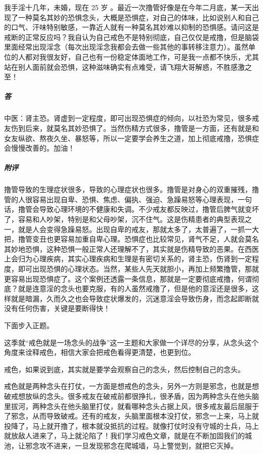 \begin{case}
    我手淫十几年，未婚，现在 25 岁 。最近一次撸管好像是在今年二月底，某一天出现了一种莫名其妙的恐惧念头，大概是恐惧症，对自己的体味，比如说别人和自己的口气、汗味特别敏感，一靠近人就有一种莫名其妙难以抑制的恐惧感。请问这是戒断的正常反应吗？我自认为自己戒色不是特别彻底，自己仅仅是戒撸，但是脑袋里面经常出现淫念（每次出现淫念我都会去做一些其他的事转移注意力）。虽然单位的人都对我很友好，自己也有一份稳定体面地工作，可是我一点都不快乐，尤其站在别人面前就会恐惧，这种滋味确实有点难受，请飞翔大哥解惑，不胜感激之至！
    \subparagraph{答} 中医：肾主恐。肾虚到一定程度，即可出现恐惧症的倾向，以社恐为常见，很多戒友伤到后来，就莫名其妙恐惧了。当然伤精方式很多，撸管是一方面，还有就是和女友纵欲、熬夜久坐、暴怒等，所以一定要学会养生之道，加上彻底戒撸，恐惧症会慢慢改善的。加油！
    \subparagraph{附评} 撸管导致的生理症状很多，导致的心理症状也很多。撸管是对身心的双重摧残，撸管的人很容易出现自卑、恐惧、焦虑、偏执、强迫、急躁易怒等心理表现，一句话，撸管会导致心理环境的不健康和失调。不少戒友都反映过，撸管后脾气就变坏了，容易和人吵架，特别是和父母吵架，沉不住气。这是伤精患者的典型表现之一，就是人会变得急躁易怒。出现自卑的戒友，那就太多了，太普遍了，一抓一大把，撸管变丑也更容易加重自卑心理。恐惧症也比较常见，肾气不足，人就会莫名其妙地恐惧，这种恐惧一般正常人还理解不了，其实就是伤精导致的恶果。在西医上会归为心理疾病，其实心理疾病和生理是有密切关系的，肾主恐，伤肾到一定程度，即可出现恐惧的心理状态。当然，某些人先天就胆小，再加上频繁撸管，那就更容易出现恐惧症了。这个案例还透露一条信息，那就是一定要彻底戒撸，何谓彻底？就是连意淫的念头也要克服，有的人虽然戒撸了，但是他的意淫还是很多，这样就是暗漏，久而久之也会导致症状爆发的，沉迷意淫会导致伤身，而念起即断就没有任何伤害，关键是要断得快！
\end{case}

下面步入正题。

这季就“戒色就是一场念头的战争”这一主题和大家做一个详尽的分享，从念头这个角度来诠释戒色，相信大家会把戒色看得更清楚，也更到位。

戒色，如果说到底，其实就是要学会观察自己的念头，然后控制自己的念头。

戒色就是两种念头在打仗，一方面是想戒色的念头，另外一方则是邪念，也就是想破戒想放纵的念头。很多戒友在破戒前都很挣扎，很矛盾，因为两种念头在他头脑里拔河，两种念头在他头脑里打仗，就看哪种念头占据上风，很多戒友最后屈服于了邪念，从而导致破戒。还有的戒友，头脑里面根本没打仗，邪念一上来，马上就投降了，马上就开撸了，根本就没抵抗的过程。就像打仗时没有守城的士兵，马上就放敌人进来了，马上就沦陷了！我们学习戒色文章，就是在不断加固我们的城池，让邪念攻不进来，一旦发现邪念在爬城墙，马上警觉到，就把它灭掉。

